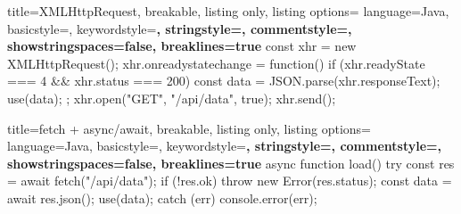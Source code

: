\begin{tcblisting}{%
    title={XMLHttpRequest}, 
    breakable, 
    listing only, 
    listing options={%
        language=Java, %
        basicstyle=\small\ttfamily,
        keywordstyle=\color{purple}\bfseries,
        stringstyle=\color{blue},
        commentstyle=\color{gray},
        showstringspaces=false,
        breaklines=true
    }
}
const xhr = new XMLHttpRequest();
xhr.onreadystatechange = function() {
    if (xhr.readyState === 4 && xhr.status === 200) {
        const data = JSON.parse(xhr.responseText);
        use(data);
    }
};
xhr.open("GET", "/api/data", true);
xhr.send();
\end{tcblisting}
\begin{tcblisting}{%
    title={fetch + async/await}, 
    breakable, 
    listing only, 
    listing options={%
        language=Java, 
        basicstyle=\small\ttfamily,
        keywordstyle=\color{purple}\bfseries,
        stringstyle=\color{blue},
        commentstyle=\color{gray},
        showstringspaces=false,
        breaklines=true
    }
}
async function load() {
    try {
        const res = await fetch("/api/data");
        if (!res.ok) throw new Error(res.status);
        const data = await res.json();
        use(data);
    } catch (err) {
        console.error(err);
    }
}
\end{tcblisting}